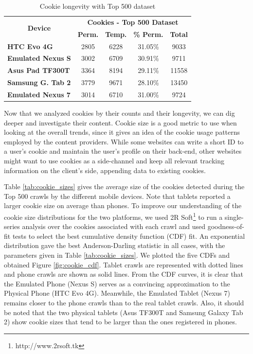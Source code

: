 \documentclass{acm_proc_article-sp}
\begin{document}
\begin{table}[htbp]
  \centering
  \caption{Cookie longevity with Top 500 dataset}
    \begin{tabular}{|c|c|c|c|c|}
    \hline
    \multicolumn{1}{|c|}{\multirow{2}[4]{*}{\textbf{Device}}} & \multicolumn{4}{|c|}{\textbf{Cookies - Top 500 Dataset}} \\ \cline{2-5}
    \multicolumn{1}{|c|}{} & \textbf{Perm.} & \textbf{Temp.} & \textbf{\% Perm.} & \textbf{Total} \\ \hline
    \multicolumn{1}{|l|}{\textbf{HTC Evo 4G}} & 2805  & 6228  & 31.05\% & 9033 \\
    \multicolumn{1}{|l|}{\textbf{Emulated Nexus S}} & 3002  & 6709  & 30.91\% & 9711 \\
    \multicolumn{1}{|l|}{\textbf{Asus Pad TF300T}} & 3364  & 8194  & 29.11\% & 11558 \\
    \multicolumn{1}{|l|}{\textbf{Samsung G. Tab 2}} & 3779  & 9671  & 28.10\% & 13450 \\
    \multicolumn{1}{|l|}{\textbf{Emulated Nexus 7}} & 3014  & 6710  & 31.00\% & 9724 \\ \hline
    \end{tabular}%
  \label{tab:cookie_longevity}%
\end{table}%

Now that we analyzed cookies by their counts and their longevity, we can dig deeper and investigate their content. Cookie size is a good metric to use when looking at the overall trends, since it gives an idea of the cookie usage patterns employed by the content providers. While some websites can write a short ID to a user's cookie and maintain the user's profile on their back-end, other websites might want to use cookies as a side-channel and keep all relevant tracking information on the client's side, appending data to existing cookies.

Table \ref{tab:cookie_sizes} gives the average size of the cookies detected during the Top 500 crawls by the different mobile devices. Note that tablets reported a larger cookie size on average than phones. To improve our understanding of the cookie size distributions for the two platforms, we used 2R Soft\footnote{http://www.2rsoft.tk} to run a single-series analysis over the cookies associated with each crawl and used goodness-of-fit tests to select the best cumulative density function (CDF) fit. An exponential distribution gave the best Anderson-Darling statistic in all cases, with the parameters given in Table \ref{tab:cookie_sizes}. We plotted the five CDFs and obtained Figure \ref{fig:cookie_cdf}. Tablet crawls are represented with dotted lines and phone crawls are shown as solid lines. From the CDF curves, it is clear that the Emulated Phone (Nexus S) serves as a convincing approximation to the Physical Phone (HTC Evo 4G). Meanwhile, the Emulated Tablet (Nexus 7) remains closer to the phone crawls than to the real tablet crawls. Also, it should be noted that the two physical tablets (Asus TF300T and Samsung Galaxy Tab 2) show cookie sizes that tend to be larger than the ones registered in phones.
\end{document}
